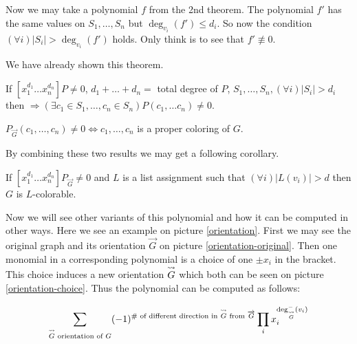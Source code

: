 Now we may take a polynomial $f$ from the 2nd theorem. The polynomial $f'$ has the same values on $S_{1}, \dots, S_{n}$ but $\deg_{v_{i}}(f') \leq d_{i}$. So now the condition $(\forall i) |S_{i}| > \deg_{v_{i}} (f')$ holds. Only think is to see that $f' \not\equiv 0$.

We have already shown this theorem.

\begin{thm}
	If $[x_{1}^{d_1} \dots x_{n}^{d_n}]P \neq 0$, $d_1 + \dots + d_n = $ total degree of $P$, $S_1, \dots, S_{n}, (\forall i) |S_i| > d_i$ then $\Rightarrow (\exists c_{1} \in S_{1}, \dots, c_{n} \in S_{n}) P(c_{1}, \dots c_n) \neq 0$.
\end{thm}

\begin{observ}
	$P_{\overrightarrow{G}} (c_1, \dots, c_n) \neq 0 \Leftrightarrow c_1, \dots, c_n$ is a proper coloring of $G$.
\end{observ}

By combining these two results we may get a following corollary.

\begin{cor}
	If $[x_{1}^{d_1} \dots x_{n}^{d_n}]P_{\overrightarrow{G}} \neq 0$ and $L$ is a list assignment such that $(\forall i) |L(v_i)| > d$ then $G$ is $L$-colorable.
\end{cor}

Now we will see other variants of this polynomial and how it can be computed in other ways. Here we see an example on picture \ref{orientation}. First we may see the original graph and its orientation $\overrightarrow{G}$ on picture \ref{orientation-original}. Then one monomial in a corresponding polynomial is a choice of one $\pm x_{i}$ in the bracket. This choice induces a new orientation $\mathrel{\overset{\leadsto}{G}}$ which both can be seen on picture \ref{orientation-choice}. Thus the polynomial can be computed as follows:

$$
\sum_{\mathrel{\overset{\leadsto}{G}} \text{ orientation of }G} (-1)^{\text{\# of different direction in } \mathrel{\overset{\leadsto}{G}} \text{ from } \overrightarrow{G}} \prod_{i} x_{i}^{\deg^{-}_{\mathrel{\overset{\leadsto}{G}}}(v_{i})}
$$

